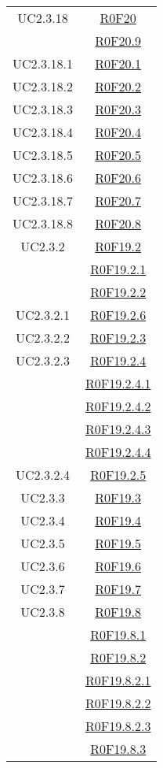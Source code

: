 \documentclass[../AnalisiDeiRequisiti.tex]{subfiles}
\begin{document}
\begin{longtable}{|c|c|}
	UC2.3.18 & \hyperlink{R0F20}{R0F20}\\& \hyperlink{R0F20.9}{R0F20.9}\\\hline
	UC2.3.18.1 & \hyperlink{R0F20.1}{R0F20.1}\\\hline
	UC2.3.18.2 & \hyperlink{R0F20.2}{R0F20.2}\\\hline
	UC2.3.18.3 & \hyperlink{R0F20.3}{R0F20.3}\\\hline
	UC2.3.18.4 & \hyperlink{R0F20.4}{R0F20.4}\\\hline
	UC2.3.18.5 & \hyperlink{R0F20.5}{R0F20.5}\\\hline
	UC2.3.18.6 & \hyperlink{R0F20.6}{R0F20.6}\\\hline
	UC2.3.18.7 & \hyperlink{R0F20.7}{R0F20.7}\\\hline
	UC2.3.18.8 & \hyperlink{R0F20.8}{R0F20.8}\\\hline
	UC2.3.2 & \hyperlink{R0F19.2}{R0F19.2}\\& \hyperlink{R0F19.2.1}{R0F19.2.1}\\& \hyperlink{R0F19.2.2}{R0F19.2.2}\\\hline
	UC2.3.2.1 & \hyperlink{R0F19.2.6}{R0F19.2.6}\\\hline
	UC2.3.2.2 & \hyperlink{R0F19.2.3}{R0F19.2.3}\\\hline
	UC2.3.2.3 & \hyperlink{R0F19.2.4}{R0F19.2.4}\\& \hyperlink{R0F19.2.4.1}{R0F19.2.4.1}\\& \hyperlink{R0F19.2.4.2}{R0F19.2.4.2}\\& \hyperlink{R0F19.2.4.3}{R0F19.2.4.3}\\& \hyperlink{R0F19.2.4.4}{R0F19.2.4.4}\\\hline
	UC2.3.2.4 & \hyperlink{R0F19.2.5}{R0F19.2.5}\\\hline
	UC2.3.3 & \hyperlink{R0F19.3}{R0F19.3}\\\hline
	UC2.3.4 & \hyperlink{R0F19.4}{R0F19.4}\\\hline
	UC2.3.5 & \hyperlink{R0F19.5}{R0F19.5}\\\hline
	UC2.3.6 & \hyperlink{R0F19.6}{R0F19.6}\\\hline
	UC2.3.7 & \hyperlink{R0F19.7}{R0F19.7}\\\hline
	UC2.3.8 & \hyperlink{R0F19.8}{R0F19.8}\\& \hyperlink{R0F19.8.1}{R0F19.8.1}\\& \hyperlink{R0F19.8.2}{R0F19.8.2}\\& \hyperlink{R0F19.8.2.1}{R0F19.8.2.1}\\& \hyperlink{R0F19.8.2.2}{R0F19.8.2.2}\\& \hyperlink{R0F19.8.2.3}{R0F19.8.2.3}\\& \hyperlink{R0F19.8.3}{R0F19.8.3}\\\hline

\end{longtable}
\end{document}
